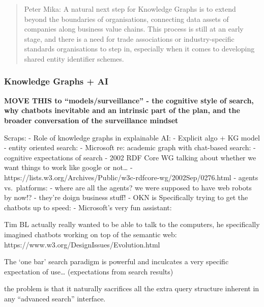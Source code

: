 \begin{quote}
Peter Mika: A natural next step for Knowledge Graphs is to extend beyond
the boundaries of organisations, connecting data assets of companies
along business value chains. This process is still at an early stage,
and there is a need for trade associations or industry-specific
standards organisations to step in, especially when it comes to
developing shared entity identifier schemes. \cite{panExploitingLinkedData2017} 
\end{quote}

\hypertarget{knowledge-graphs-ai}{%
\subsubsection{Knowledge Graphs + AI}\label{knowledge-graphs-ai}}

\textbf{MOVE THIS to ``models/surveillance'' - the cognitive style of
search, why chatbots inevitable and an intrinsic part of the plan, and
the broader conversation of the surveillance mindset}

Scraps: - Role of knowledge graphs in explainable AI: \cite{lecueRoleKnowledgeGraphs2020}  - Explicit algo + KG model - entity
oriented search: \cite{balogEntityOrientedSearch2018}  -
Microsoft re: academic graph with chat-based search: \cite{sinhaOverviewMicrosoftAcademic2015}  - cognitive expectations of
search - 2002 RDF Core WG talking about whether we want things to work
like google or not\ldots{} \cite{sticklerReMonotonicityWas2002} 
- https://lists.w3.org/Archives/Public/w3c-rdfcore-wg/2002Sep/0276.html
- agents vs.~platforms: - where are all the agents? we were supposed to
have web robots by now!? \cite{ciorteaDecadeHindsightMissing2019}  - they're doign business stuff! \cite{mcburneyAgentsAreAll2007}  - OKN is Specifically trying to get the chatbots up to speed: \cite{bigdatainteragencyworkinggroupOpenKnowledgeNetwork2018}  -
Microsoft's very fun assistant: \cite{IntroducingMicrosoft3652023} 

Tim BL actually really wanted to be able to talk to the computers, he
specifically imagined chatbots working on top of the semantic web:
https://www.w3.org/DesignIssues/Evolution.html

The `one bar' search paradigm is powerful and inculcates a very specific
expectation of use\ldots{} (expectations from search results)

the problem is that it naturally sacrifices all the extra query
structure inherent in any ``advanced search'' interface.

